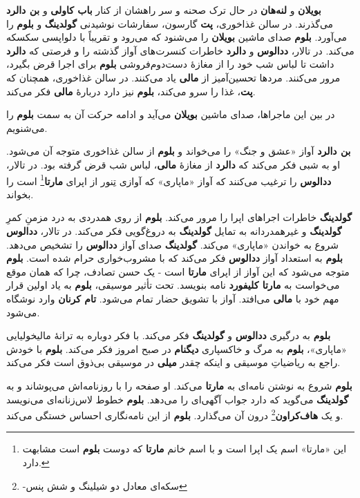 \documentclass[12pt]{book}
\newcommand{\noun}[1]{{\textbf{#1}}}
\begin{document}
    \noun{بویلان} و \noun{لنه‌هان} در حال ترک صحنه و سر راهشان از کنار \noun{باب کاولی} و \noun{بن دالرد} می‌گذرند. در سالن غذاخوری، \noun{پت} گارسون، سفارشات نوشیدنی \noun{گولدینگ} و \noun{بلوم} را می‌آورد. \noun{بلوم} صدای ماشین \noun{بویلان} را می‌شنود که می‌رود و تقریباً با دلواپسی سکسکه می‌کند. در تالار، \noun{ددالوس} و \noun{دالرد} خاطرات کنسرت‌های آواز گذشته را و فرصتی که \noun{دالرد} داشت تا لباس شب خود را از مغازهٔ دست‌دوم‌فروشی \noun{بلوم} برای اجرا قرض بگیرد، مرور می‌کنند. مردها تحسین‌آمیز از \noun{مالی} یاد می‌کنند. در سالن غذاخوری، همچنان که \noun{پت}، غذا را سرو می‌کند، \noun{بلوم} نیز دارد دربارهٔ \noun{مالی} فکر می‌کند.

    در بین این ماجراها، صدای ماشین \noun{بویلان} می‌آید و ادامه حرکت آن به سمت \noun{بلوم} را می‌شنویم.

    \noun{بن دالرد}  آواز «عشق و جنگ» را می‌خواند و \noun{بلوم} از سالن غذاخوری متوجه آن می‌شود. او به شبی فکر می‌کند که \noun{دالرد} از مغازهٔ \noun{مالی}، لباس شب قرض گرفته بود. در تالار، \noun{ددالوس} را ترغیب می‌کنند که آواز «ماپاری» که آوازی تِنور از اپرای \noun{مارتا}\footnote{این «مارتا» اسم یک اپرا است و با اسم خانم \noun{مارتا} که دوست \noun{بلوم} است مشابهت دارد.} است را بخواند.

    \noun{گولدینگ} خاطرات اجراهای اپرا را مرور می‌کند. \noun{بلوم} از روی همدردی به درد مزمنِ کمرِ \noun{گولدینگ} و غیرهمدردانه به تمایل \noun{گولدینگ} به دروغ‌گویی فکر می‌کند. در تالار، \noun{ددالوس} شروع به خواندن «ماپاری» می‌کند. \noun{گولدینگ} صدای آواز \noun{ددالوس} را تشخیص می‌دهد. \noun{بلوم} به استعداد آواز \noun{ددالوس} فکر می‌کند که با مشروب‌خواری حرام شده است. \noun{بلوم} متوجه می‌شود که این آواز از اپرای \noun{مارتا} است - یک حسن تصادف، چرا که همان موقع می‌خواست به \noun{مارتا کلیفورد} نامه بنویسد. تحت تأثیر موسیقی، \noun{بلوم} به یاد اولین قرار مهم خود با \noun{مالی} می‌افتد. آواز با تشویق حضار تمام می‌شود. \noun{تام کرنان} وارد نوشگاه می‌شود.

    \noun{بلوم} به درگیری \noun{ددالوس} و \noun{گولدینگ} فکر می‌کند. با فکر دوباره به ترانهٔ مالیخولیایی «ماپاری»، \noun{بلوم} به مرگ و خاکسپاری \noun{دیگنام} در صبح امروز فکر می‌کند. \noun{بلوم} با خودش راجع به ریاضیاتِ موسیقی و اینکه چقدر \noun{میلی} در موسیقی بی‌ذوق است فکر می‌کند.

    \noun{بلوم} شروع به نوشتن نامه‌ای به \noun{مارتا} می‌کند. او صفحه را با روزنامه‌اش می‌پوشاند و به \noun{گولدینگ} می‌گوید که دارد جواب آگهی‌ای را می‌دهد. \noun{بلوم} خطوط لاس‌زنانه‌ای می‌نویسد و یک \noun{هاف‌کراون}\footnote{-سکه‌ای معادل دو شیلینگ و شش پنس} درون آن می‌گذارد. \noun{بلوم} از این نامه‌نگاری احساس خستگی می‌کند.
\end{document}
